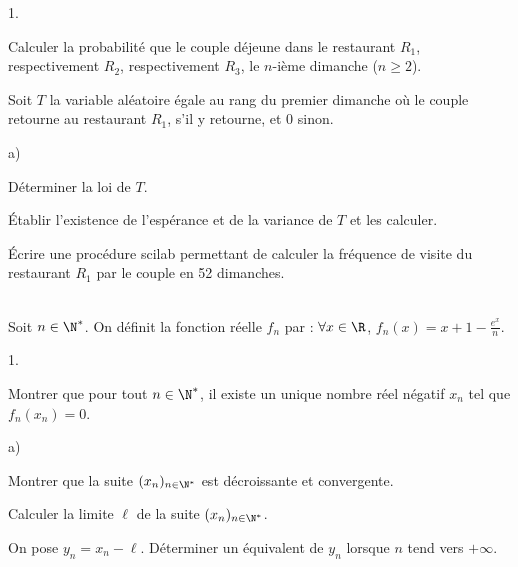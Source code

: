 \documentclass[11pt]{article}%
\begin{document}
\begin{exerciceAP}
\begin{noliste}{1.}
  \item Calculer la probabilité que le couple déjeune dans le
    restaurant $R_1$, respectivement $R_2$, respectivement $R_3$, le
    $n$-ième dimanche ($n \geq 2$).

  \item Soit $T$ la variable aléatoire égale au rang du premier
    dimanche où le couple retourne au restaurant $R_1$, s'il y
    retourne, et 0 sinon. 

    \begin{noliste}{a)}
    \setlength{\itemsep}{2mm}
    \item Déterminer la loi de $T$.
    \item Établir l'existence de l'espérance et de la variance de $T$
      et les calculer.
    \end{noliste}

  \item Écrire une procédure scilab permettant de calculer la
    fréquence de visite du restaurant $R_1$ par le couple en 52
    dimanches.
  \end{noliste}
\end{exerciceAP}


\begin{exerciceSP}~\\
  Soit $n \in \N^*$. On définit la fonction réelle $f_n$ par :
  $\forall x \in \R$, $f_n (x) = x + 1 - \frac{ e^x }{ n }$.
  \begin{noliste}{1.}
    \setlength{\itemsep}{2mm}
  \item Montrer que pour tout $n \in \N^*$, il existe un unique nombre
    réel négatif $x_n$ tel que $f_n ( x_n ) = 0$.
  \item 
    \begin{noliste}{a)}
    \setlength{\itemsep}{2mm}
    \item Montrer que la suite $(x_n)_{ n \in \N^* }$ est décroissante
      et convergente.
    \item Calculer la limite $\ell$ de la suite $(x_n)_{ n \in \N^* }$.
    \end{noliste}
  \item On pose $y_n = x_n - \ell$. Déterminer un équivalent de $y_n$
    lorsque $n$ tend vers $+\infty$.
  \end{noliste}
\end{exerciceSP}


\newpage
\end{document}
